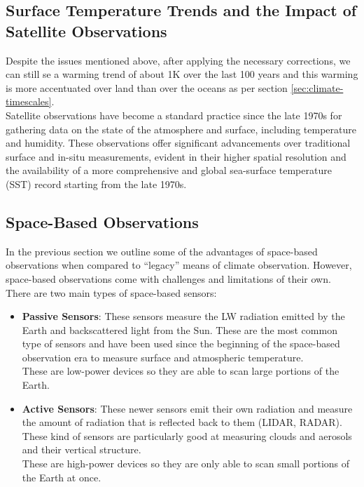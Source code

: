 \subsection{Surface Temperature Trends and the Impact of Satellite Observations}
\label{sec:surface_temp_trends}

Despite the issues mentioned above, after applying the necessary corrections,
we can still se a warming trend of about 1K over the last 100 years and this 
warming is more accentuated over land than over the oceans as per section 
\ref{sec:climate-timescales}.\\

Satellite observations have become a standard practice since the late 1970s for 
gathering data on the state of the atmosphere and surface, including 
temperature and humidity. These observations offer significant advancements over
traditional surface and in-situ measurements, evident in their higher spatial 
resolution and the availability of a more comprehensive and global sea-surface 
temperature (\gls{SST}) record starting from the late 1970s.

\subsection{Space-Based Observations}
\label{sec:space_based_obs}

In the previous section we outline some of the advantages of space-based
observations when compared to ``legacy'' means of climate observation. However,
space-based observations come with challenges and limitations of their own.\\

\noindent There are two main types of space-based sensors:
\begin{itemize}
    \item \textbf{Passive Sensors}: These sensors measure the \gls{LW} 
    radiation emitted by the Earth and backscattered light from the Sun. These
    are the most common type of sensors and have been used since the beginning
    of the space-based observation era to measure surface and atmospheric
    temperature.\\
    These are low-power devices so they are able to scan large portions of the
    Earth.
    \item \textbf{Active Sensors}: These newer sensors emit their own radiation and
    measure the amount of radiation that is reflected back to them (LIDAR, RADAR).
    These kind of sensors are particularly good at measuring clouds and aerosols
    and their vertical structure.\\
    These are high-power devices so they are only able to scan small portions of
    the Earth at once.
\end{itemize}

